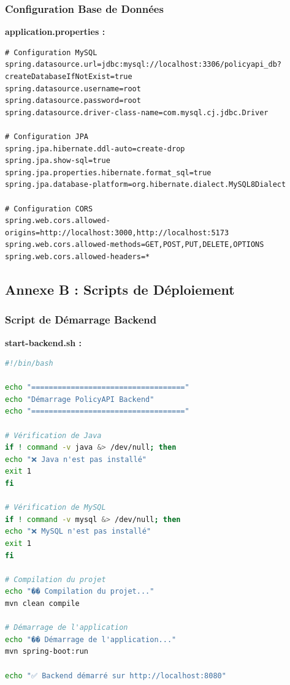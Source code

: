 \documentclass[12pt,a4paper]{article}
\begin{document}
\subsubsection{Configuration Base de Données}

\begin{codebox}
\textbf{application.properties :}
\begin{lstlisting}
# Configuration MySQL
spring.datasource.url=jdbc:mysql://localhost:3306/policyapi_db?createDatabaseIfNotExist=true
spring.datasource.username=root
spring.datasource.password=root
spring.datasource.driver-class-name=com.mysql.cj.jdbc.Driver

# Configuration JPA
spring.jpa.hibernate.ddl-auto=create-drop
spring.jpa.show-sql=true
spring.jpa.properties.hibernate.format_sql=true
spring.jpa.database-platform=org.hibernate.dialect.MySQL8Dialect

# Configuration CORS
spring.web.cors.allowed-origins=http://localhost:3000,http://localhost:5173
spring.web.cors.allowed-methods=GET,POST,PUT,DELETE,OPTIONS
spring.web.cors.allowed-headers=*
\end{lstlisting}
\end{codebox}

\subsection{Annexe B : Scripts de Déploiement}

\subsubsection{Script de Démarrage Backend}

\begin{codebox}
\textbf{start-backend.sh :}
\begin{lstlisting}[language=bash]
#!/bin/bash

echo "==================================="
echo "Démarrage PolicyAPI Backend"
echo "==================================="

# Vérification de Java
if ! command -v java &> /dev/null; then
echo "❌ Java n'est pas installé"
exit 1
fi

# Vérification de MySQL
if ! command -v mysql &> /dev/null; then
echo "❌ MySQL n'est pas installé"
exit 1
fi

# Compilation du projet
echo "�� Compilation du projet..."
mvn clean compile

# Démarrage de l'application
echo "�� Démarrage de l'application..."
mvn spring-boot:run

echo "✅ Backend démarré sur http://localhost:8080"
\end{lstlisting}
\end{codebox}
\end{document}
